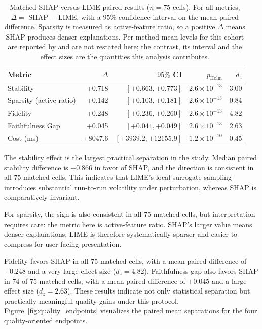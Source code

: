\documentclass[10pt,a4paper,twoside]{article}
\begin{document}
\begin{table}[t]
\centering
\caption{Matched SHAP-versus-LIME paired results ($n=75$ cells). For all
metrics, $\Delta = $ SHAP $-$ LIME, with a $95\%$ confidence interval on the
mean paired difference. Sparsity is measured as active-feature ratio, so a
positive $\Delta$ means SHAP produces denser explanations. Per-method mean
levels for this cohort are reported by \citet{herrera2026framework} and are
not restated here; the contrast, its interval and the effect sizes are the
quantities this analysis contributes.}
\label{tab:paired_main}
\begin{tabular}{lrrrr}
\toprule
Metric & $\Delta$ & $95\%$ CI & $p_{\mathrm{Holm}}$ & $d_z$ \\
\midrule
Stability & +0.718 & $[+0.663, +0.773]$ & $2.6\times10^{-13}$ & 3.00 \\
Sparsity (active ratio) & +0.142 & $[+0.103, +0.181]$ & $2.6\times10^{-13}$ & 0.84 \\
Fidelity & +0.248 & $[+0.236, +0.260]$ & $2.6\times10^{-13}$ & 4.82 \\
Faithfulness Gap & +0.045 & $[+0.041, +0.049]$ & $2.6\times10^{-13}$ & 2.63 \\
Cost (ms) & +8047.6 & $[+3939.2, +12155.9]$ & $1.2\times10^{-10}$ & 0.45 \\
\bottomrule
\end{tabular}
\end{table}

The stability effect is the largest practical separation in the study.
Median paired stability difference is $+0.866$ in favor of SHAP, and the
direction is consistent in all 75 matched cells. This indicates that
LIME's local surrogate sampling introduces substantial run-to-run
volatility under perturbation, whereas SHAP is comparatively invariant.

For sparsity, the sign is also consistent in all 75 matched cells, but
interpretation requires care: the metric here is active-feature ratio.
SHAP's larger value means denser explanations; LIME is therefore
systematically sparser and easier to compress for user-facing presentation.

Fidelity favors SHAP in all 75 matched cells, with a mean paired
difference of $+0.248$ and a very large effect size ($d_z = 4.82$).
Faithfulness gap also favors SHAP in 74 of 75 matched cells, with a mean
paired difference of $+0.045$ and a large effect size ($d_z = 2.63$).
These results indicate not only statistical separation but practically
meaningful quality gains under this protocol.
Figure~\ref{fig:quality_endpoints} visualizes the paired mean separations
for the four quality-oriented endpoints.
\end{document}
